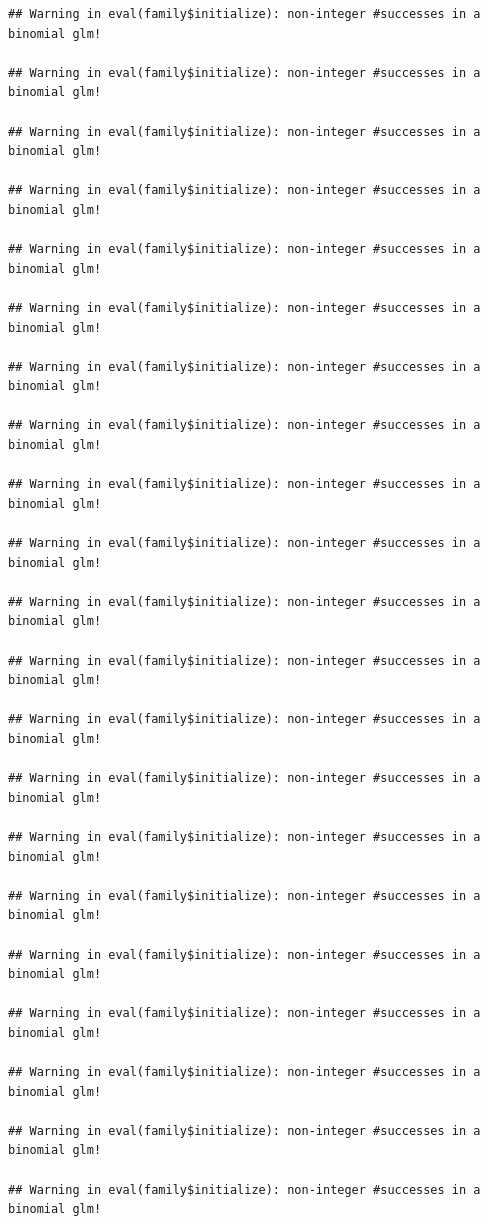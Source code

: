 \documentclass[
  10pt,
]{book}
\begin{document}
\begin{verbatim}
## Warning in eval(family$initialize): non-integer #successes in a binomial glm!

## Warning in eval(family$initialize): non-integer #successes in a binomial glm!

## Warning in eval(family$initialize): non-integer #successes in a binomial glm!

## Warning in eval(family$initialize): non-integer #successes in a binomial glm!

## Warning in eval(family$initialize): non-integer #successes in a binomial glm!

## Warning in eval(family$initialize): non-integer #successes in a binomial glm!

## Warning in eval(family$initialize): non-integer #successes in a binomial glm!

## Warning in eval(family$initialize): non-integer #successes in a binomial glm!

## Warning in eval(family$initialize): non-integer #successes in a binomial glm!

## Warning in eval(family$initialize): non-integer #successes in a binomial glm!

## Warning in eval(family$initialize): non-integer #successes in a binomial glm!

## Warning in eval(family$initialize): non-integer #successes in a binomial glm!

## Warning in eval(family$initialize): non-integer #successes in a binomial glm!

## Warning in eval(family$initialize): non-integer #successes in a binomial glm!

## Warning in eval(family$initialize): non-integer #successes in a binomial glm!

## Warning in eval(family$initialize): non-integer #successes in a binomial glm!

## Warning in eval(family$initialize): non-integer #successes in a binomial glm!

## Warning in eval(family$initialize): non-integer #successes in a binomial glm!

## Warning in eval(family$initialize): non-integer #successes in a binomial glm!

## Warning in eval(family$initialize): non-integer #successes in a binomial glm!

## Warning in eval(family$initialize): non-integer #successes in a binomial glm!


\end{verbatim}
\end{document}

